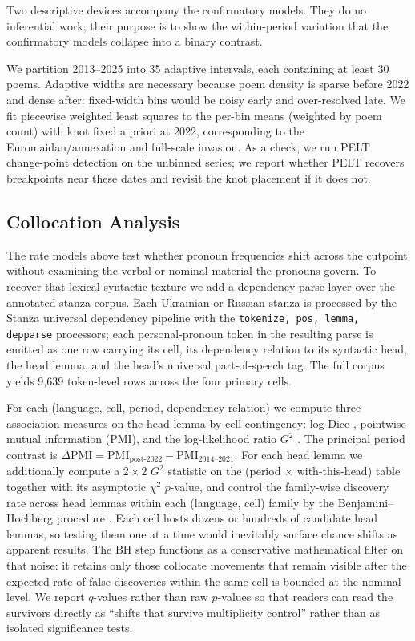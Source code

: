 \documentclass[12pt]{interact}
\theoremstyle{plain}%
\theoremstyle{definition}
\theoremstyle{remark}
\begin{document}
Two descriptive devices accompany the confirmatory models. They do no inferential work; their purpose is to show the within-period variation that the confirmatory models collapse into a binary contrast.

We partition 2013–2025 into 35 adaptive intervals, each containing at least 30 poems. Adaptive widths are necessary because poem density is sparse before 2022 and dense after: fixed-width bins would be noisy early and over-resolved late. We fit piecewise weighted least squares to the per-bin means (weighted by poem count) with knot fixed a priori at 2022, corresponding to the Euromaidan/annexation and full-scale invasion. As a check, we run PELT change-point detection on the unbinned series; we
report whether PELT recovers breakpoints near these dates and revisit the knot placement if it does not.

\subsection{Collocation Analysis }
\label{sec:methods-collocations}

The rate models above test whether pronoun frequencies shift across the cutpoint without examining the verbal or nominal material the pronouns govern. To recover that lexical-syntactic texture we add a dependency-parse layer over the annotated stanza corpus. Each Ukrainian or Russian stanza is processed by the Stanza universal dependency pipeline \citep{qi2020stanza} with the \texttt{tokenize, pos, lemma, depparse} processors; each personal-pronoun token in the resulting parse is emitted as one row carrying its cell, its dependency relation to its syntactic head, the head lemma, and the head's universal part-of-speech tag. The full corpus yields 9{,}639 token-level rows across the four primary cells.

For each (language, cell, period, dependency relation) we compute three association measures on the head-lemma-by-cell contingency: log-Dice \citep{rychly2008lexicographer}, pointwise mutual information (PMI), and the log-likelihood ratio $G^2$ \citep{dunning1993accurate}. The principal period contrast is $\Delta\mathrm{PMI} = \mathrm{PMI}_{\text{post-2022}} - \mathrm{PMI}_{\text{2014--2021}}$. For each head lemma we additionally compute a $2 \times 2$ $G^2$ statistic on the (period $\times$ with-this-head) table together with its asymptotic $\chi^2$ $p$-value, and control the family-wise discovery rate across head lemmas within each (language, cell) family by the Benjamini--Hochberg procedure \citep{benjamini1995controlling}. Each cell hosts dozens or hundreds of candidate head lemmas, so testing them one at a time would inevitably surface chance shifts as apparent results. The BH step functions as a conservative mathematical filter on that noise: it retains only those collocate movements that remain visible after the expected rate of false discoveries within the same cell is bounded at the nominal level. We report $q$-values rather than raw $p$-values so that readers can read the survivors directly as ``shifts that survive multiplicity control'' rather than as isolated significance tests.
\end{document}
